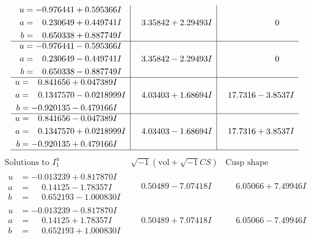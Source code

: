 \documentclass[1p]{elsarticle_modified}
\theoremstyle{definition}
\newcommand{\I}{\sqrt{-1}}
\begin{document}
$$\begin{array}{c|c|c}
\begin{aligned}
u &= -0.976441 + 0.595366 I \\
a &= \phantom{-}0.230649 + 0.449741 I \\
b &= \phantom{-}0.650338 + 0.887749 I\end{aligned}
 & \phantom{-}3.35842 + 2.29493 I & \phantom{-0.000000 } 0 \\ \hline\begin{aligned}
u &= -0.976441 - 0.595366 I \\
a &= \phantom{-}0.230649 - 0.449741 I \\
b &= \phantom{-}0.650338 - 0.887749 I\end{aligned}
 & \phantom{-}3.35842 - 2.29493 I & \phantom{-0.000000 } 0 \\ \hline\begin{aligned}
u &= \phantom{-}0.841656 + 0.047389 I \\
a &= \phantom{-}0.1347570 - 0.0218999 I \\
b &= -0.920135 - 0.479166 I\end{aligned}
 & \phantom{-}4.03403 + 1.68694 I & \phantom{-}17.7316 - 3.8537 I \\ \hline\begin{aligned}
u &= \phantom{-}0.841656 - 0.047389 I \\
a &= \phantom{-}0.1347570 + 0.0218999 I \\
b &= -0.920135 + 0.479166 I\end{aligned}
 & \phantom{-}4.03403 - 1.68694 I & \phantom{-}17.7316 + 3.8537 I\\
 \hline 
 \end{array}$$\newpage$$\begin{array}{c|c|c}  
\text{Solutions to }I^u_{1}& \I (\text{vol} + \sqrt{-1}CS) & \text{Cusp shape}\\
 \hline 
\begin{aligned}
u &= -0.013239 + 0.817870 I \\
a &= \phantom{-}0.14125 - 1.78357 I \\
b &= \phantom{-}0.652193 - 1.000830 I\end{aligned}
 & \phantom{-}0.50489 - 7.07418 I & \phantom{-}6.05066 + 7.49946 I \\ \hline\begin{aligned}
u &= -0.013239 - 0.817870 I \\
a &= \phantom{-}0.14125 + 1.78357 I \\
b &= \phantom{-}0.652193 + 1.000830 I\end{aligned}
 & \phantom{-}0.50489 + 7.07418 I & \phantom{-}6.05066 - 7.49946 I \\ \hline\begin{aligned}

\end{aligned}
\end{array}$$
\end{document}
